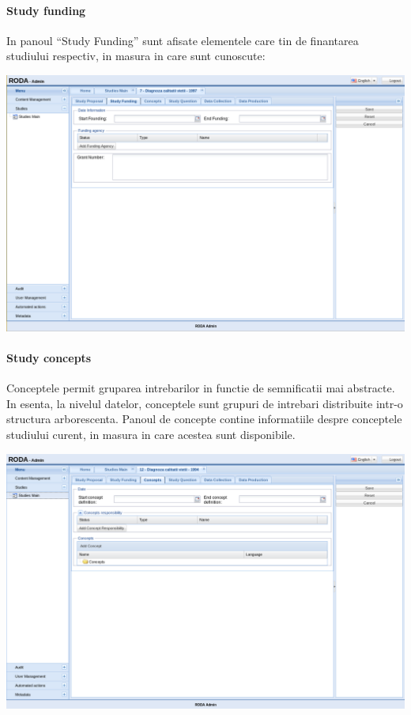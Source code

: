 \paragraph{Study funding}

In panoul “Study Funding” sunt afisate elementele care tin de finantarea studiului respectiv, in masura in care sunt cunoscute:

\includegraphics[width=16cm]{img/studyedit-funding}

\paragraph{Study concepts}

Conceptele permit gruparea intrebarilor in functie de semnificatii mai abstracte. In esenta, la nivelul datelor, conceptele sunt grupuri de intrebari distribuite intr-o structura arborescenta. Panoul de concepte contine informatiile despre conceptele studiului curent, in masura in care acestea sunt disponibile.

\includegraphics[width=16cm]{img/studyedit-concepts}

